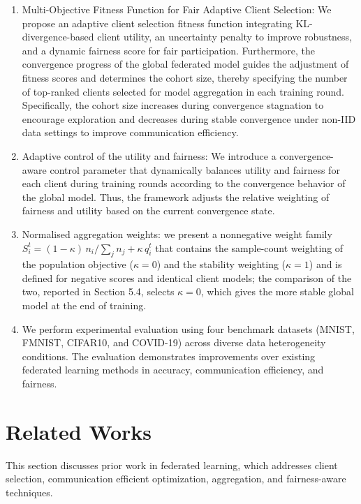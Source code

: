\documentclass[pdflatex,sn-mathphys-num,oneside]{sn-jnl}%
\theoremstyle{thmstyleone}%
\theoremstyle{thmstyletwo}%
\theoremstyle{thmstylethree}%
\begin{document}
\begin{enumerate}[label=\arabic*-]
\item Multi-Objective Fitness Function for Fair Adaptive Client Selection: We propose an adaptive client selection fitness function integrating KL-divergence-based client utility, an uncertainty penalty to improve robustness, and a dynamic fairness score for fair participation. Furthermore, the convergence progress of the global federated model guides the adjustment of fitness scores and determines the cohort size, thereby specifying the number of top-ranked clients selected for model aggregation in each training round. Specifically, the cohort size increases during convergence stagnation to encourage exploration and decreases during stable convergence under non-IID data settings to improve communication efficiency.

\item Adaptive control of the utility and fairness: We introduce a convergence-aware control parameter that dynamically balances utility and fairness for each client during training rounds according to the convergence behavior of the global model. Thus, the framework adjusts the relative weighting of fairness and utility based on the current convergence state.

\item Normalised aggregation weights: we present a nonnegative weight family $S_i^t=(1-\kappa)\,n_i/\sum_j n_j+\kappa\,q_i^t$ that contains the sample-count weighting of the population objective ($\kappa=0$) and the stability weighting ($\kappa=1$) and is defined for negative scores and identical client models; the comparison of the two, reported in Section 5.4, selects $\kappa=0$, which gives the more stable global model at the end of training.

\item We perform experimental evaluation using four benchmark datasets (MNIST, FMNIST, CIFAR10, and COVID-19) across diverse data heterogeneity conditions. The evaluation demonstrates improvements over existing federated learning methods in accuracy, communication efficiency, and fairness.
\end{enumerate}




\section{Related Works}
\label{sec2}

This section discusses prior work in federated learning, which addresses client selection, communication efficient optimization, aggregation, and fairness-aware techniques.
\end{document}
